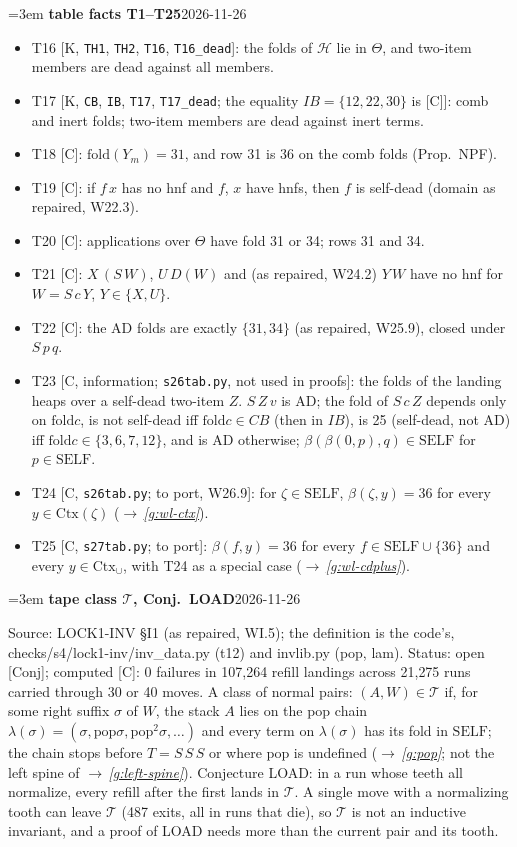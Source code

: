 \documentclass[11pt]{amsart}
\makeatletter
\newcommand{\fold}{\mathrm{fold}}
\newcommand{\pop}{\mathrm{pop}}
\newcommand{\Hc}{\mathcal H}
\newcommand{\Self}{\mathrm{SELF}}
\newcounter{sense}
\newenvironment{entry}[3]{%
  \par\addvspace{\medskipamount}\noindent\phantomsection
  \def\@currentlabel{#2}\label{#1}\setcounter{sense}{0}\raggedright\emergencystretch=3em%
  \textbf{#2}\hfill{\footnotesize\textsf{#3}}\par\nopagebreak\noindent\ignorespaces}%
  {\par}
\newcommand{\src}[1]{\textsf{Source:} #1.\enskip}
\newcommand{\status}[1]{\textsf{Status:} #1.\enskip}
\renewcommand{\see}[1]{$\rightarrow$\,\emph{\ref{#1}}}
\makeatother
\begin{document}
\begin{entry}{g:wl-table-facts}{table facts T1--T25}{2026-11-26}
\begin{itemize}
is the stack of a normal pair, $S\,a\,(S\,a)$ is self-dead.
\item T16 [K, \texttt{TH1}, \texttt{TH2}, \texttt{T16}, \texttt{T16\_dead}]: the folds of $\Hc$ lie in
$\Theta$, and two-item members are dead against all members.
\item T17 [K, \texttt{CB}, \texttt{IB}, \texttt{T17}, \texttt{T17\_dead}; the equality
$IB=\{12,22,30\}$ is [C]]: comb and inert folds; two-item members are dead against inert terms.
\item T18 [C]: $\fold(Y_m)=31$, and row 31 is 36 on the comb folds (Prop.~NPF).
\item T19 [C]: if $f\,x$ has no hnf and $f$, $x$ have hnfs, then $f$ is self-dead (domain as repaired,
W22.3).
\item T20 [C]: applications over $\Theta$ have fold 31 or 34; rows 31 and 34.
\item T21 [C]: $X\,(S\,W)$, $U\,D(W)$ and (as repaired, W24.2) $Y\,W$ have no hnf for $W=S\,c\,Y$,
$Y\in\{X,U\}$.
\item T22 [C]: the AD folds are exactly $\{31,34\}$ (as repaired, W25.9), closed under $S\,p\,q$.
\item T23 [C, information; \texttt{s26tab.py}, not used in proofs]: the folds of the landing heaps
over a self-dead two-item $Z$. $S\,Z\,v$ is AD; the fold of $S\,c\,Z$ depends only on $\fold c$, is not
self-dead iff $\fold c\in CB$ (then in $IB$), is 25 (self-dead, not AD) iff $\fold c\in\{3,6,7,12\}$,
and is AD otherwise; $\beta(\beta(0,p),q)\in\Self$ for $p\in\Self$.
\item T24 [C, \texttt{s26tab.py}; to port, W26.9]: for $\zeta\in\Self$, $\beta(\zeta,y)=36$ for every
$y\in\mathrm{Ctx}(\zeta)$ (\see{g:wl-ctx}).
\item T25 [C, \texttt{s27tab.py}; to port]: $\beta(f,y)=36$ for every $f\in\Self\cup\{36\}$ and every
$y\in\mathrm{Ctx}_\cup$, with T24 as a special case (\see{g:wl-cdplus}).
\end{itemize}
\end{entry}

\begin{entry}{g:wl-tape}{tape class $\mathcal T$, Conj.~LOAD}{2026-11-26}
\src{LOCK1-INV \S I1 (as repaired, WI.5); the definition is the code's,
checks/s4/lock1-inv/inv\_data.py (t12) and invlib.py (pop, lam)}
\status{open [Conj]; computed [C]: 0 failures in 107{,}264 refill landings across 21{,}275 runs
carried through 30 or 40 moves}
A class of normal pairs: $(A,W)\in\mathcal T$ if, for some right suffix $\sigma$ of $W$, the stack $A$
lies on the pop chain $\lambda(\sigma)=(\sigma,\pop\sigma,\pop^2\sigma,\dots)$ and every term on
$\lambda(\sigma)$ has its fold in $\Self$; the chain stops before $T=S\,S\,S$ or where $\pop$ is
undefined (\see{g:pop}; not the left spine of \see{g:left-spine}). Conjecture LOAD: in a run whose
teeth all normalize, every refill after the first lands in $\mathcal T$. A single move with a
normalizing tooth can leave $\mathcal T$ (487 exits, all in runs that die), so $\mathcal T$ is not an
inductive invariant, and a proof of LOAD needs more than the current pair and its tooth.
\end{entry}
\end{document}
